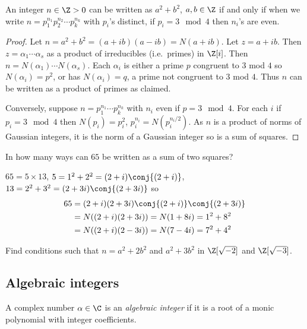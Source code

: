 \documentclass[a4paper]{article}
\theoremstyle{definition}
\begin{document}
\begin{corollary}
  An integer \(n \in \Z > 0\) can be written as \(a^2 + b^2\), \(a, b \in \Z\) if and only if when we write \(n = p_1^{n_1}p_2^{n_2}\cdots p_k^{n_k}\) with \(p_i\)'s distinct, if \(p_i = 3 \mod 4\) then \(n_i\)'s are even.
\end{corollary}

\begin{proof}
  Let \(n = a^2 + b^2 = (a + ib)(a - ib) = N(a + ib)\). Let \(z = a + ib\). Then \(z = \alpha_1\cdots \alpha_s\) as a product of irreducibles (i.e.\ primes) in \(\Z[i]\). Then \(n = N(\alpha_1)\cdots N(\alpha_s)\). Each \(\alpha_i\) is either a prime \(p\) congruent to \(3\) mod \(4\) so \(N(\alpha_i) = p^2\), or has \(N(\alpha_i) = q\), a prime not congruent to \(3\) mod \(4\). Thus \(n\) can be written as a product of primes as claimed.

  Conversely, suppose \(n = p_1^{n_1} \cdots p_k^{n_k}\) with \(n_i\) even if \(p = 3 \mod 4\). For each \(i\) if \(p_i = 3 \mod 4\) then \(N(p_i) = p_i^2\), \(p_i^{n_i} = N(p_i^{n_i/2})\). As \(n\) is a product of norms of Gaussian integers, it is the norm of a Gaussian integer so is a sum of squares.
\end{proof}

\begin{eg}
  In how many ways can \(65\) be written as a sum of two squares?
  
  \(65 = 5 \times 13\), \(5 = 1^2 + 2^2 = (2 + i) \conj{(2 + i)}\), \(13 = 2^2 + 3^2 = (2 + 3i)\conj{(2 + 3i)}\) so
    \begin{align*}
      65 &= (2 + i)(2 + 3i)\conj{(2 + i)}\conj{(2 + 3i)} \\
         &= N((2 + i)(2 + 3i)) = N(1 + 8i) = 1^2 + 8^2 \\
         &= N((2 + i)(2 - 3i)) = N(7 - 4i) = 7^2 + 4^2
    \end{align*}
\end{eg}

\begin{ex}[Challenge]
  Find conditions such that \(n = a^2 + 2b^2\) and \(a^2 + 3b^2\) in \(\Z[\sqrt{-2}]\) and \(\Z[\sqrt{-3}]\).
\end{ex}

\subsection{Algebraic integers}

\begin{definition}
  A complex number \(\alpha \in \C\) is an \emph{algebraic integer} if it is a root of a monic polynomial with integer coefficients.
\end{definition}
\end{document}
